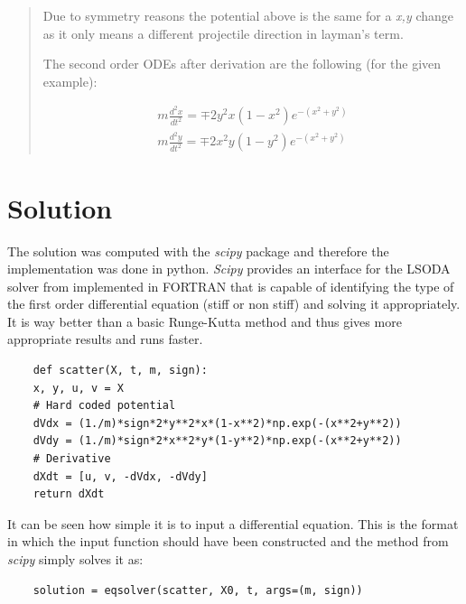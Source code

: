 \documentclass[a4paper,12pt]{article}
\begin{document}
\begin{abstract}
	\par Due to symmetry reasons the potential above is the same for
	a \textit{x,y} change as it only means a different projectile direction in
	layman's term.

	\par The second order ODEs after derivation are the following
	(for the given example):

	\begin{align}
		m\frac{d^{2}x}{dt^{2}} = \mp 2y^{2}x(1-x^{2})e^{-(x^{2}+y^{2})} \\
		m\frac{d^{2}y}{dt^{2}} = \mp 2x^{2}y(1-y^{2})e^{-(x^{2}+y^{2})}
	\end{align}
\end{abstract}

\tableofcontents

\newpage

\section{Solution}

\par The solution was computed with the \textit{scipy} package and therefore
the implementation was done in python. \textit{Scipy} provides an interface
for the LSODA solver from implemented in FORTRAN that is capable of identifying
the type of the first order differential equation (stiff or non stiff) and solving
it appropriately. It is way better than a basic Runge-Kutta method and thus gives
more appropriate results and runs faster.

\lstset{language=Python}
\lstset{frame=lines}
\lstset{basicstyle=\footnotesize}
\begin{lstlisting}
    def scatter(X, t, m, sign):
    x, y, u, v = X
    # Hard coded potential
    dVdx = (1./m)*sign*2*y**2*x*(1-x**2)*np.exp(-(x**2+y**2))
    dVdy = (1./m)*sign*2*x**2*y*(1-y**2)*np.exp(-(x**2+y**2))
    # Derivative
    dXdt = [u, v, -dVdx, -dVdy]
    return dXdt
\end{lstlisting}

\par It can be seen how simple it is to input a differential equation. This is the
format in which the input function should have been constructed and the method from
\textit{scipy} simply solves it as:

\lstset{language=Python}
\lstset{frame=lines}
\lstset{basicstyle=\footnotesize}
\begin{lstlisting}
    solution = eqsolver(scatter, X0, t, args=(m, sign))
\end{lstlisting}
\end{document}
